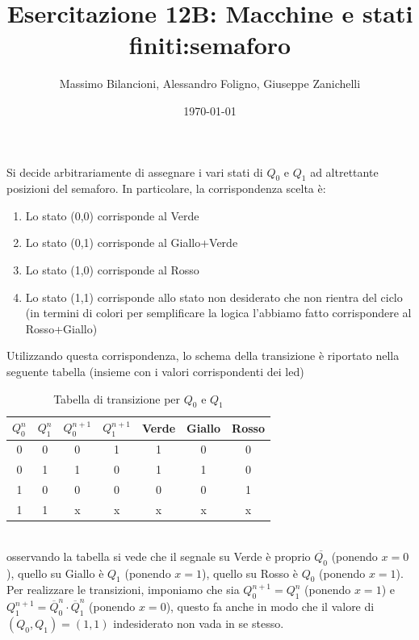 \documentclass[10pt,a4paper]{article}
\date{\today}
\title{Esercitazione 12B: Macchine e stati finiti:semaforo}
\author{Massimo Bilancioni, Alessandro Foligno, Giuseppe Zanichelli}
\begin{document}
	
\maketitle
Si decide arbitrariamente di assegnare i vari stati di $Q_0$ e $Q_1$ ad altrettante posizioni del semaforo. In particolare, la corrispondenza scelta è:\\
\begin{enumerate}
	\item Lo stato (0,0) corrisponde al Verde
	\item Lo stato (0,1) corrisponde al Giallo+Verde
	\item Lo stato (1,0) corrisponde al Rosso
	\item Lo stato (1,1) corrisponde allo stato non desiderato che non rientra del ciclo (in termini di colori per semplificare la  logica  l'abbiamo fatto corrispondere al Rosso+Giallo)
\end{enumerate}
Utilizzando questa corrispondenza, lo schema della transizione è riportato nella seguente tabella (insieme con i valori corrispondenti dei led)\
\begin{table}[h]\centering
\begin{tabular}{|c|c|c|c|c|c|c|}
	\hline 
	$Q_0^n$ & $Q_1^n$ & $Q_0^{n+1}$ & $Q_1^{n+1}$ & Verde & Giallo & Rosso \\ 
	\hline 
	0 & 0 & 0 & 1 & 1 & 0 & 0 \\ 
	\hline 
	0 & 1 & 1 & 0 & 1 & 1 & 0 \\ 
	\hline 
	1 & 0 & 0 & 0 & 0 & 0 & 1 \\ 
	\hline 
	1 & 1 & x & x & x & x & x \\ 
	\hline 
\end{tabular} 	
\caption{Tabella di transizione per $Q_0$ e $Q_1$}
\end{table}
\\

osservando la tabella si vede che il segnale su Verde è proprio $\overline{Q_0}$ (ponendo $x =0$), quello su Giallo è $Q_1$ (ponendo $x= 1$), quello su Rosso è $Q_0$ (ponendo $x= 1$).\\
Per realizzare le transizioni, imponiamo che sia $Q_0^{n+1}=Q_1^n$ (ponendo $x= 1$)  e $Q_1^{n+1}=\overline{Q}_0^n \cdot \overline{Q}_1^n$ (ponendo $x= 0$), questo fa anche in modo che il valore di $(Q_0,Q_1)=(1,1)$ indesiderato non vada in se stesso.\\
\end{document}
